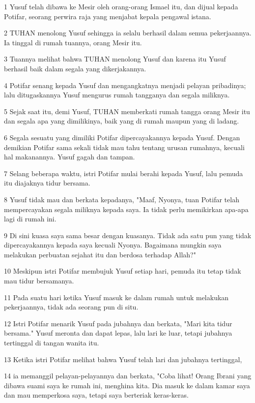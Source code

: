 \par 1 Yusuf telah dibawa ke Mesir oleh orang-orang Ismael itu, dan dijual kepada Potifar, seorang perwira raja yang menjabat kepala pengawal istana.
\par 2 TUHAN menolong Yusuf sehingga ia selalu berhasil dalam semua pekerjaannya. Ia tinggal di rumah tuannya, orang Mesir itu.
\par 3 Tuannya melihat bahwa TUHAN menolong Yusuf dan karena itu Yusuf berhasil baik dalam segala yang dikerjakannya.
\par 4 Potifar senang kepada Yusuf dan mengangkatnya menjadi pelayan pribadinya; lalu ditugaskannya Yusuf mengurus rumah tangganya dan segala miliknya.
\par 5 Sejak saat itu, demi Yusuf, TUHAN memberkati rumah tangga orang Mesir itu dan segala apa yang dimilikinya, baik yang di rumah maupun yang di ladang.
\par 6 Segala sesuatu yang dimiliki Potifar dipercayakannya kepada Yusuf. Dengan demikian Potifar sama sekali tidak mau tahu tentang urusan rumahnya, kecuali hal makanannya. Yusuf gagah dan tampan.
\par 7 Selang beberapa waktu, istri Potifar mulai berahi kepada Yusuf, lalu pemuda itu diajaknya tidur bersama.
\par 8 Yusuf tidak mau dan berkata kepadanya, "Maaf, Nyonya, tuan Potifar telah mempercayakan segala miliknya kepada saya. Ia tidak perlu memikirkan apa-apa lagi di rumah ini.
\par 9 Di sini kuasa saya sama besar dengan kuasanya. Tidak ada satu pun yang tidak dipercayakannya kepada saya kecuali Nyonya. Bagaimana mungkin saya melakukan perbuatan sejahat itu dan berdosa terhadap Allah?"
\par 10 Meskipun istri Potifar membujuk Yusuf setiap hari, pemuda itu tetap tidak mau tidur bersamanya.
\par 11 Pada suatu hari ketika Yusuf masuk ke dalam rumah untuk melakukan pekerjaannya, tidak ada seorang pun di situ.
\par 12 Istri Potifar menarik Yusuf pada jubahnya dan berkata, "Mari kita tidur bersama." Yusuf meronta dan dapat lepas, lalu lari ke luar, tetapi jubahnya tertinggal di tangan wanita itu.
\par 13 Ketika istri Potifar melihat bahwa Yusuf telah lari dan jubahnya tertinggal,
\par 14 ia memanggil pelayan-pelayannya dan berkata, "Coba lihat! Orang Ibrani yang dibawa suami saya ke rumah ini, menghina kita. Dia masuk ke dalam kamar saya dan mau memperkosa saya, tetapi saya berteriak keras-keras.
